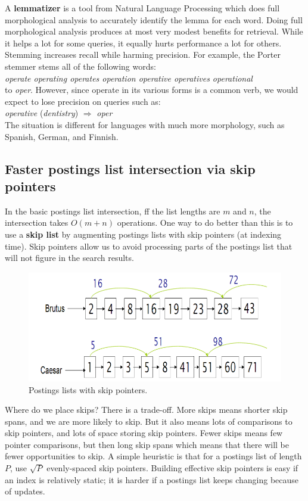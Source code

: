 \documentclass[letterpaper,11pt]{article}
\begin{document}
A \textbf{lemmatizer} is a tool from Natural Language Processing which does full morphological analysis to accurately identify the lemma for each word. Doing full morphological analysis produces at most very modest benefits for retrieval. While it helps a lot for some queries, it equally hurts performance a lot for others. Stemming increases recall while harming precision. For example, the Porter stemmer stems all of the following words:
\medskip\\
\indent \textit{operate operating operates operation operative operatives operational}
\medskip\\
to \textit{oper}. However, since operate in its various forms is a common verb, we would expect to lose precision on queries such as:
\medskip\\
\indent \textit{operative} (\textit{dentistry}) $\Rightarrow$ \textit{oper}
\medskip\\
The situation is different for languages with much more morphology, such
as Spanish, German, and Finnish.

\subsection{Faster postings list intersection via skip pointers}
In the basic postings list intersection, ff the list lengths are $m$ and $n$, the intersection takes $O(m+ n)$ operations. One way to do better than this is to use a \textbf{skip list} by augmenting postings lists with skip pointers (at indexing time). Skip pointers allow us to avoid processing parts of the postings list that will not figure in the search results.
\begin{figure}[H]
    \centering
    \includegraphics[scale=0.65]{sect2/figure_2_9.png}
    \caption{Postings lists with skip pointers.}
\end{figure}
 Where do we place skips? There is a trade-off. More skips means shorter
skip spans, and we are more likely to skip. But it also means lots of comparisons to skip pointers, and lots of space storing skip pointers. Fewer skips means few pointer comparisons, but then long skip spans which means that there will be fewer opportunities to skip. A simple heuristic is that for a postings list of length $P$, use $\sqrt{P}$ evenly-spaced skip pointers. Building effective skip pointers is easy if an index is relatively static; it
is harder if a postings list keeps changing because of updates.
\end{document}
